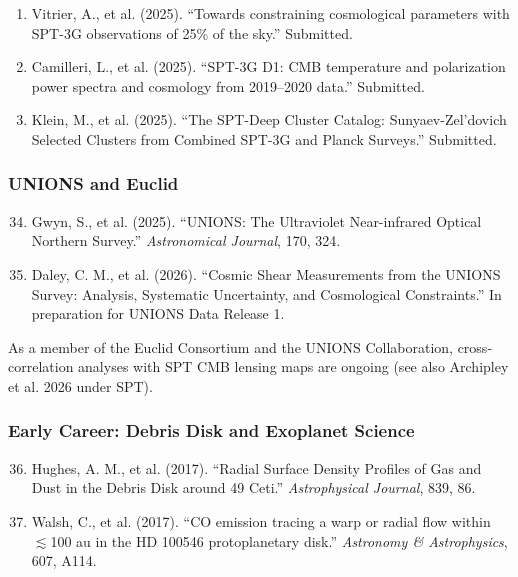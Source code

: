 \documentclass[11pt,a4paper]{article}
\begin{document}
\begin{enumerate}
\item Vitrier, A., et al. (2025). ``Towards constraining cosmological parameters with SPT-3G observations of 25\% of the sky.'' Submitted.

\item Camilleri, L., et al. (2025). ``SPT-3G D1: CMB temperature and polarization power spectra and cosmology from 2019--2020 data.'' Submitted.

\item Klein, M., et al. (2025). ``The SPT-Deep Cluster Catalog: Sunyaev-Zel'dovich Selected Clusters from Combined SPT-3G and Planck Surveys.'' Submitted.
\end{enumerate}

\subsubsection*{UNIONS and Euclid}

\begin{enumerate}
\setcounter{enumi}{33}
\item Gwyn, S., et al. (2025). ``UNIONS: The Ultraviolet Near-infrared Optical Northern Survey.'' \textit{Astronomical Journal}, 170, 324.

\item Daley, C. M., et al. (2026). ``Cosmic Shear Measurements from the UNIONS Survey: Analysis, Systematic Uncertainty, and Cosmological Constraints.'' In preparation for UNIONS Data Release 1.
\end{enumerate}

As a member of the Euclid Consortium and the UNIONS Collaboration, cross-correlation analyses with SPT CMB lensing maps are ongoing (see also Archipley et al. 2026 under SPT).

\subsubsection*{Early Career: Debris Disk and Exoplanet Science}

\begin{enumerate}
\setcounter{enumi}{35}
\item Hughes, A. M., et al. (2017). ``Radial Surface Density Profiles of Gas and Dust in the Debris Disk around 49 Ceti.'' \textit{Astrophysical Journal}, 839, 86.

\item Walsh, C., et al. (2017). ``CO emission tracing a warp or radial flow within $\lesssim$100 au in the HD 100546 protoplanetary disk.'' \textit{Astronomy \& Astrophysics}, 607, A114.
\end{enumerate}
\end{document}
